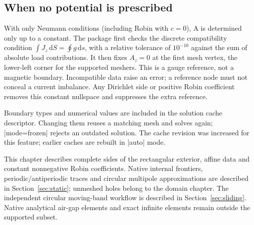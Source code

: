 \subsection{When no potential is prescribed}
With only Neumann conditions (including Robin with $c=0$), A is determined
only up to a constant. The package first checks the discrete compatibility
condition $\int J_z\,\mathrm dS=\oint g\,\mathrm ds$, with a relative
tolerance of $10^{-10}$ against the sum of absolute load contributions.
It then fixes $A_z=0$ at the first mesh vertex, the lower-left corner for
the supported meshers. This is a gauge reference, not a magnetic boundary.
Incompatible data raise an error; a reference node must not conceal a
current imbalance. Any Dirichlet side or positive Robin coefficient
removes this constant nullspace and suppresses the extra reference.

Boundary types and numerical values are included in the solution cache
descriptor. Changing them reuses a matching mesh and solves again;
|mode=frozen| rejects an outdated solution. The cache revision was
increased for this feature; earlier caches are rebuilt in |auto| mode.

This chapter describes complete sides of the rectangular exterior, affine data
and constant nonnegative Robin coefficients. Native internal frontiers,
periodic/antiperiodic traces and circular multipole approximations are described
in Section~\ref{sec:static}; unmeshed holes belong to the domain chapter.
The independent circular moving-band workflow is described in
Section~\ref{sec:sliding}. Native analytical air-gap elements and exact
infinite elements remain outside the supported subset.
